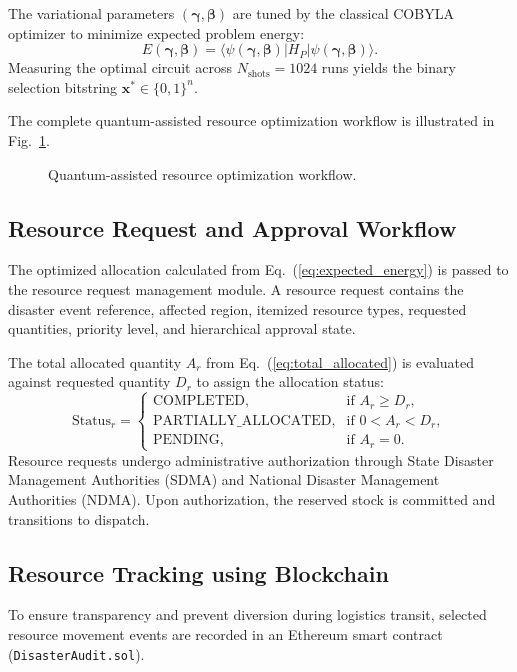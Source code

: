 \documentclass[conference]{IEEEtran}
\begin{document}
The variational parameters $(\boldsymbol{\gamma}, \boldsymbol{\beta})$ are tuned by the classical COBYLA optimizer to minimize expected problem energy:
\begin{equation}
E(\boldsymbol{\gamma}, \boldsymbol{\beta}) = \langle \psi(\boldsymbol{\gamma}, \boldsymbol{\beta}) | H_P | \psi(\boldsymbol{\gamma}, \boldsymbol{\beta}) \rangle.
\label{eq:expected_energy}
\end{equation}
Measuring the optimal circuit across $N_{\text{shots}} = 1024$ runs yields the binary selection bitstring $\mathbf{x}^* \in \{0, 1\}^n$.

The complete quantum-assisted resource optimization workflow is illustrated in Fig.~\ref{fig:qaoa_workflow}.

\begin{figure}[htbp]
\centering
\fbox{\rule{0pt}{1.8in} \rule{0.9\linewidth}{0pt}}
\caption{Quantum-assisted resource optimization workflow.}
\label{fig:qaoa_workflow}
\end{figure}

\subsection{Resource Request and Approval Workflow}
The optimized allocation calculated from Eq.~(\ref{eq:expected_energy}) is passed to the resource request management module. A resource request contains the disaster event reference, affected region, itemized resource types, requested quantities, priority level, and hierarchical approval state.

The total allocated quantity $A_r$ from Eq.~(\ref{eq:total_allocated}) is evaluated against requested quantity $D_r$ to assign the allocation status:
\begin{equation}
\text{Status}_r = \begin{cases}
\text{COMPLETED}, & \text{if } A_r \ge D_r, \\
\text{PARTIALLY\_ALLOCATED}, & \text{if } 0 < A_r < D_r, \\
\text{PENDING}, & \text{if } A_r = 0.
\end{cases}
\label{eq:status}
\end{equation}
Resource requests undergo administrative authorization through State Disaster Management Authorities (SDMA) and National Disaster Management Authorities (NDMA). Upon authorization, the reserved stock is committed and transitions to dispatch.

\subsection{Resource Tracking using Blockchain}
To ensure transparency and prevent diversion during logistics transit, selected resource movement events are recorded in an Ethereum smart contract (\texttt{DisasterAudit.sol}).
\end{document}
